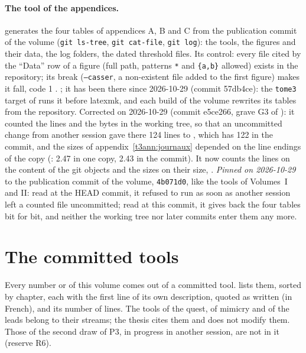 \paragraph{The tool of the appendices.}  generates the four tables of appendices A, B and C from the  publication commit of the volume (\texttt{git ls-tree}, \texttt{git cat-file}, \texttt{git log}): the tools, the figures and their data, the log folders, the dated threshold files. Its control: every file cited by the ``Data'' row of a figure (full path, patterns \texttt{*} and \texttt{\{a,b\}} allowed) exists in the repository; its break (\texttt{--casser}, a non-existent file added to the first figure) makes it fall, code 1 \mes. ; it has been there since 2026-10-29 (commit 57db4ce): the \texttt{tome3} target of  runs it before latexmk, and each build of the volume rewrites its tables from the repository. Corrected on 2026-10-29 (commit e5ce266, grave G3 of ): it counted the lines and the bytes in the working tree, so that an uncommitted change from another session gave there 124 lines to , which has 122 in the commit, and the sizes of appendix~\ref{t3ann:journaux} depended on the line endings of the copy (: \SI{2.47}{\Mo} in one copy, \SI{2.43}{\Mo} in the commit). It now counts the lines on the content of the git objects and the sizes on their size,  \mes. \emph{Pinned on 2026-10-29} to the publication commit of the volume, \texttt{4b071d0}, like the tools of Volumes~I and II: read at the HEAD commit, it refused to run as soon as another session left a counted file uncommitted; read at this commit, it gives back the four tables bit for bit, and neither the working tree nor later commits enter them any more.

\section{The committed tools}\label{t3ann:sec:outils}

Every number \mes{} or \calc{} of this volume comes out of a committed tool.  lists them, sorted by chapter, each with the first line of its own description, quoted as written (in French), and its number of lines. The tools of the quest, of mimicry and of the leads belong to their streams; the thesis cites them and does not modify them. Those of the second draw of P3, in progress in another session, are not in it (reserve R6).

